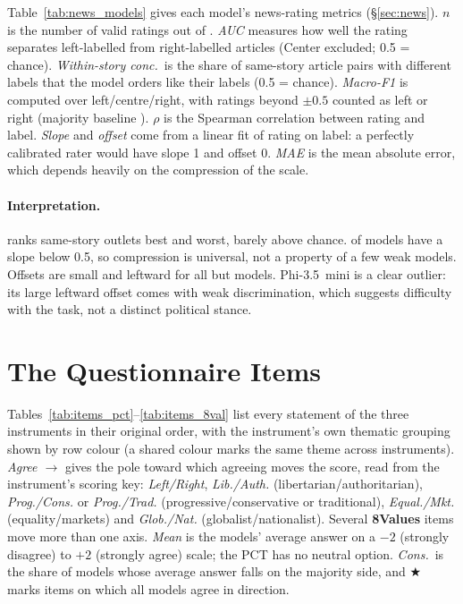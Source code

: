 \documentclass[11pt]{article}
\newcommand{\instEV}[1]{\textcolor{cEV}{\textbf{#1}}}
\newcommand{\ev}{\instEV{8Values}\xspace}
\begin{document}
Table~\ref{tab:news_models} gives each model's news-rating metrics (\S\ref{sec:news}). $n$ is the number of valid ratings out of \nNArticles. \emph{AUC} measures how well the rating separates left-labelled from right-labelled articles (Center excluded; 0.5 = chance). \emph{Within-story conc.}\ is the share of same-story article pairs with different labels that the model orders like their labels (0.5 = chance). \emph{Macro-F1} is computed over left/centre/right, with ratings beyond $\pm0.5$ counted as left or right (majority baseline \nFOneMaj). $\rho$ is the Spearman correlation between rating and label. \emph{Slope} and \emph{offset} come from a linear fit of rating on label: a perfectly calibrated rater would have slope 1 and offset 0. \emph{MAE} is the mean absolute error, which depends heavily on the compression of the scale.


\paragraph{Interpretation.} \nBestConcModel{} ranks same-story outlets best and \nWorstConcModel{} worst, barely above chance. \nSlopeBelowHalf{} of \nNModelsNews{} models have a slope below 0.5, so compression is universal, not a property of a few weak models. Offsets are small and leftward for all but \nNPosOffset{} models. Phi-3.5~mini is a clear outlier: its large leftward offset comes with weak discrimination, which suggests difficulty with the task, not a distinct political stance.

\section{The Questionnaire Items}
\label{app:allitems}

Tables~\ref{tab:items_pct}--\ref{tab:items_8val} list every statement of the three instruments in their original order, with the instrument's own thematic grouping shown by row colour (a shared colour marks the same theme across instruments). \emph{Agree $\rightarrow$} gives the pole toward which agreeing moves the score, read from the instrument's scoring key: \emph{Left/Right}, \emph{Lib./Auth.} (libertarian/authoritarian), \emph{Prog./Cons.} or \emph{Prog./Trad.} (progressive/conservative or traditional), \emph{Equal./Mkt.} (equality/markets) and \emph{Glob./Nat.} (globalist/nationalist). Several \ev items move more than one axis. \emph{Mean} is the \nNModels{} models' average answer on a $-2$ (strongly disagree) to $+2$ (strongly agree) scale; the PCT has no neutral option. \emph{Cons.}\ is the share of models whose average answer falls on the majority side, and $\bigstar$ marks items on which all \nNModels{} models agree in direction.
\end{document}
